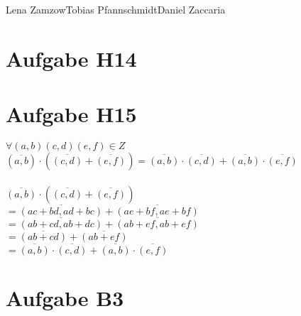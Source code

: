\documentclass[11pt,a4paper]{article}
\begin{document}
                {Lena Zamzow}{Tobias Pfannschmidt}{Daniel Zaccaria}{}{}


\section*{Aufgabe H14}
\section*{Aufgabe H15}
$\forall (a,b)(c,d)(e,f) \in Z$\\
$ (\overline{a,b}) \cdot ( \overline{(c,d)} + \overline{(e,f)} ) = \overline{(a,b)} \cdot \overline{(c,d)} + \overline{(a,b)} \cdot \overline{(e,f)} $\\
\\
$ \overline{(a,b)} \cdot ( \overline{(c,d)} + \overline{(e,f)} ) $\\
$ = \overline{(ac+bd,ad+bc)} + \overline{(ae+bf,ae+bf)}$\\
$ = \overline{(ab+cd,ab+dc)} + \overline{(ab+ef,ab+ef)}$\\
$ = \overline{(ab+cd)} + \overline{(ab+ef)}$\\
$ = \overline{(a,b)} \cdot \overline{(c,d)} + \overline{(a,b)} \cdot \overline{(e,f)} $\\


\section*{Aufgabe B3}
\end{document}

